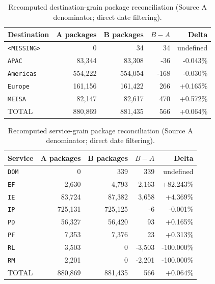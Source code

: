 \documentclass[11pt]{article}
\begin{document}
\begin{table}[htbp]\centering\scriptsize
\caption{Recomputed destination-grain package reconciliation (Source A denominator; direct date filtering).}\label{tab:verified-by_lane}
\begin{tabular}{lrrrr}\toprule
Destination & A packages & B packages & $B-A$ & Delta \\
\midrule
\texttt{<MISSING>} & 0 & 34 & 34 & undefined \\
\texttt{APAC} & 83,344 & 83,308 & -36 & -0.043\% \\
\texttt{Americas} & 554,222 & 554,054 & -168 & -0.030\% \\
\texttt{Europe} & 161,156 & 161,422 & 266 & +0.165\% \\
\texttt{MEISA} & 82,147 & 82,617 & 470 & +0.572\% \\
TOTAL & 880,869 & 881,435 & 566 & +0.064\% \\
\bottomrule\end{tabular}\end{table}

\begin{table}[htbp]\centering\scriptsize
\caption{Recomputed service-grain package reconciliation (Source A denominator; direct date filtering).}\label{tab:verified-by_service}
\begin{tabular}{lrrrr}\toprule
Service & A packages & B packages & $B-A$ & Delta \\
\midrule
\texttt{DOM} & 0 & 339 & 339 & undefined \\
\texttt{EF} & 2,630 & 4,793 & 2,163 & +82.243\% \\
\texttt{IE} & 83,724 & 87,382 & 3,658 & +4.369\% \\
\texttt{IP} & 725,131 & 725,125 & -6 & -0.001\% \\
\texttt{PD} & 56,327 & 56,420 & 93 & +0.165\% \\
\texttt{PF} & 7,353 & 7,376 & 23 & +0.313\% \\
\texttt{RL} & 3,503 & 0 & -3,503 & -100.000\% \\
\texttt{RM} & 2,201 & 0 & -2,201 & -100.000\% \\
TOTAL & 880,869 & 881,435 & 566 & +0.064\% \\
\bottomrule\end{tabular}\end{table}
\end{document}
